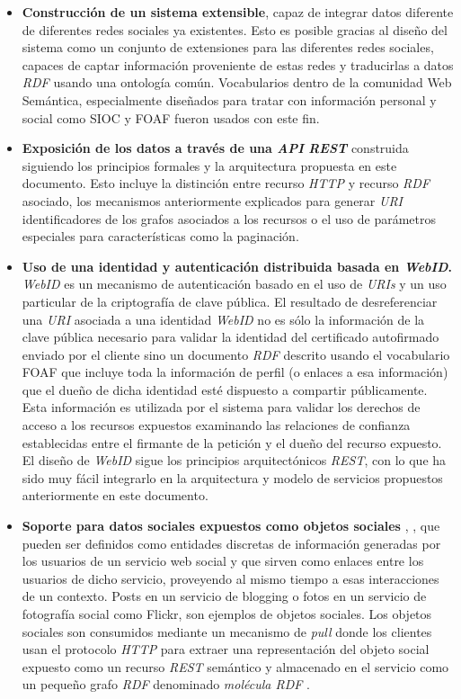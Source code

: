 \begin{itemize}
\item \textbf{Construcci\'on de un sistema extensible}, capaz de integrar datos diferente de diferentes redes sociales ya existentes. Esto es posible gracias al dise\~no del sistema como un conjunto de extensiones para las diferentes redes sociales, capaces de captar informaci\'on proveniente de estas redes y traducirlas a datos \textit{RDF} usando una ontolog\'ia com\'un.  Vocabularios dentro de la comunidad Web Sem\'antica, especialmente dise\~nados para tratar con informaci\'on personal y social como SIOC \cite{sioc} y FOAF \cite{foaf} fueron usados con este fin.\\
\item \textbf{Exposici\'on de los datos a trav\'es de una \textit{API} \textit{REST}} construida siguiendo los principios formales y la arquitectura propuesta en este documento. Esto incluye la distinci\'on entre recurso \textit{HTTP} y recurso \textit{RDF} asociado, los mecanismos anteriormente explicados para generar \textit{URI} identificadores de los grafos asociados a los recursos o el uso de par\'ametros especiales para caracter\'isticas como la paginaci\'on.
\item \textbf{Uso de una identidad y autenticaci\'on distribuida basada en \textit{WebID}.} \textit{WebID} es un mecanismo de autenticaci\'on basado en el uso de \textit{URIs} y un uso particular de la criptograf\'ia de clave p\'ublica. El resultado de desreferenciar una \textit{URI} asociada a una identidad \textit{WebID} no es s\'olo la informaci\'on de la clave p\'ublica necesario para validar la identidad del certificado autofirmado enviado por el cliente sino un documento \textit{RDF} descrito usando el vocabulario FOAF que incluye toda la informaci\'on de perfil (o enlaces a esa informaci\'on) que el due\~no de dicha identidad est\'e dispuesto a compartir p\'ublicamente. Esta informaci\'on es utilizada por el sistema para validar los derechos de acceso a los recursos expuestos examinando las relaciones de confianza establecidas entre el firmante de la petici\'on y el due\~no del recurso expuesto. El dise\~no de \textit{WebID} sigue los principios arquitect\'onicos \textit{REST}, con lo que ha sido muy f\'acil integrarlo en la arquitectura y modelo de servicios propuestos anteriormente en este documento.
\item \textbf{Soporte para datos sociales expuestos como objetos sociales} \cite{engestrom2005some}, \cite{engestrom1995voice}, que pueden ser definidos como entidades discretas de informaci\'on generadas por los usuarios de un servicio web social y que sirven como enlaces entre los usuarios de dicho servicio, proveyendo al mismo tiempo a esas interacciones de un contexto. Posts en un servicio de blogging o fotos en un servicio de fotograf\'ia social como Flickr, son ejemplos de objetos sociales. Los objetos sociales son consumidos mediante un mecanismo de \textit{pull} donde los clientes usan el protocolo \textit{HTTP} para extraer una representaci\'on del objeto social expuesto como un recurso \textit{REST} sem\'antico \cite{kinsella2008navigating} y almacenado en el servicio como un peque\~no grafo \textit{RDF} denominado \textit{mol\'ecula RDF} \cite{ding2005tracking}. 

\end{itemize}
